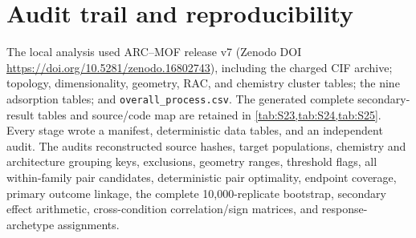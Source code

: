 \documentclass[11pt,a4paper]{article}
\begin{document}
\section{Audit trail and reproducibility}
\label{sec:audit}

The local analysis used ARC--MOF release v7 (Zenodo DOI \url{https://doi.org/10.5281/zenodo.16802743}), including
the charged CIF archive; topology, dimensionality, geometry, RAC, and chemistry
cluster tables; the nine adsorption tables; and \texttt{overall\_process.csv}.
The generated complete secondary-result tables and source/code map are retained in
\cref{tab:S23,tab:S24,tab:S25}. Every stage wrote a manifest, deterministic data
tables, and an independent audit.
The audits reconstructed source hashes, target populations, chemistry and
architecture grouping keys, exclusions, geometry ranges, threshold flags, all
within-family pair candidates, deterministic pair optimality, endpoint coverage,
primary outcome linkage, the complete 10,000-replicate bootstrap, secondary effect
arithmetic, cross-condition correlation/sign matrices, and response-archetype
assignments.
\end{document}
